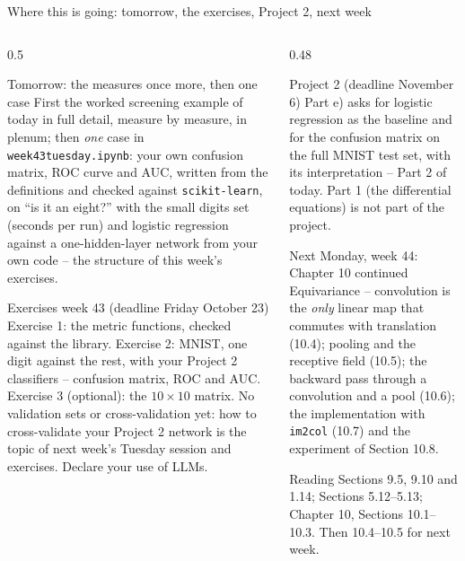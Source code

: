 \documentclass[10pt,aspectratio=169]{beamer}
\begin{document}
\begin{frame}{Where this is going: tomorrow, the exercises, Project 2, next week}
\small
\begin{columns}[T]
\begin{column}{0.5\textwidth}
\begin{block}{Tomorrow: the measures once more, then one case}
\footnotesize
First the worked screening example of today in full detail, measure by
measure, in plenum; then \emph{one} case in \texttt{week43tuesday.ipynb}:
your own confusion matrix, ROC curve and AUC, written from the definitions
and checked against \texttt{scikit-learn}, on ``is it an eight?'' with the
small digits set (seconds per run) and logistic regression against a
one-hidden-layer network from your own code -- the structure of this
week's exercises.
\end{block}
\begin{block}{Exercises week 43 (deadline Friday October 23)}
\footnotesize
Exercise 1: the metric functions, checked against the library.  Exercise
2: MNIST, one digit against the rest, with your Project 2 classifiers --
confusion matrix, ROC and AUC.  Exercise 3 (optional): the $10\times10$
matrix.  No validation sets or cross-validation yet: how to cross-validate
your Project 2 network is the topic of next week's Tuesday session and
exercises.  Declare your use of LLMs.
\end{block}
\end{column}
\begin{column}{0.48\textwidth}
\begin{block}{Project 2 (deadline November 6)}
\footnotesize
Part e) asks for logistic regression as the baseline and for the confusion
matrix on the full MNIST test set, with its interpretation -- Part 2 of
today.  Part 1 (the differential equations) is not part of the project.
\end{block}
\begin{block}{Next Monday, week 44: Chapter 10 continued}
\footnotesize
Equivariance -- convolution is the \emph{only} linear map that commutes
with translation (10.4); pooling and the receptive field (10.5); the
backward pass through a convolution and a pool (10.6); the implementation
with \texttt{im2col} (10.7) and the experiment of Section 10.8.
\end{block}
\begin{block}{Reading}
\footnotesize
Sections 9.5, 9.10 and 1.14; Sections 5.12--5.13; Chapter 10, Sections
10.1--10.3.  Then 10.4--10.5 for next week.
\end{block}
\end{column}
\end{columns}
\end{frame}
\end{document}
